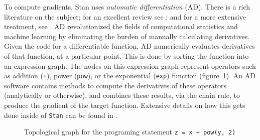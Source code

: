 \documentclass[11pt]{article}
\begin{document}
  To compute gradients, Stan uses \textit{automatic differentiation} (AD). 
  There is a rich literature on the subject; for an excellent review see \cite{Baydin:2018};
  and for a more extensive treatment, see \cite{Griewank:2008}.
  AD revolutionized the fields of computational statistics and machine learning by eliminating
  the burden of manually calculating derivatives.
  Given the code for a differentiable function, AD numerically evaluates derivatives
  of that function, at a particular point.
  This is done by sorting the function into an expression graph.
  The nodes on this expression graph represent operators such as addition (\texttt{+}),
  power (\texttt{pow}), or the exponential (\texttt{exp}) function (figure~\ref{fig:ad}).
  An AD software contains methods to compute the derivatives of these operators
  (analytically or otherwise), and combines these results, via the chain rule,
  to produce the gradient of the target function.
  Extensive details on how this gets done inside of \texttt{Stan} can be found in \cite{Carpenter:2015}.
  
  \begin{figure}
  \begin{center}
  \end{center}
  \caption{Topological graph for the programing statement \texttt{z = x + pow(y, 2)}}
  \label{fig:ad}
  \end{figure}
  
\end{document}
